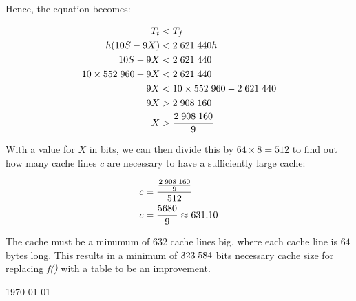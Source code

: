 \documentclass[fontsize=11pt, paper=a4, titlepage]{article}
\begin{document}
\begin{enumerate}[a)]
Hence, the equation becomes:

    \begin{align*}
        T_t &< T_f \\
        h(10S-9X) &< 2\thickspace 621\thickspace 440h \\
        10S - 9X &< 2\thickspace 621\thickspace 440 \\
        10\times 552\thickspace 960 - 9X &< 2\thickspace 621\thickspace 440 \\
        9X &< 10\times 552\thickspace 960 - 2\thickspace 621\thickspace 440 \\
        9X &> 2\thickspace 908\thickspace 160 \\
        X &> \frac{2\thickspace 908\thickspace 160}{9}
    \end{align*}

With a value for $X$ in bits, we can then divide this by $64\times 8 = 512$ to
find out how many cache lines $c$ are necessary to have a sufficiently large
cache:

    \begin{align*}
        c &= \frac{\frac{2\thickspace 908\thickspace 160}{9}}{512} \\
        c &= \frac{5680}{9} \approx 631.10
    \end{align*}

The cache must be a minumum of $632$ cache lines big, where each cache line is
$64$ bytes long. This results in a minimum of $323\thickspace 584$ bits
necessary cache size for replacing \textit{f()} with a table to be an
improvement.

\end{enumerate}

\vfill
\hfill \large{\today}
\end{document}
